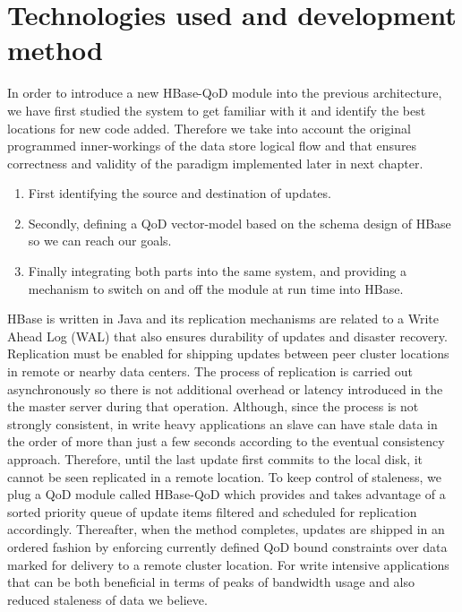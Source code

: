 \section{Technologies used and development method}\label{method}
In order to introduce a new HBase-QoD module into the previous architecture, we have first studied the system to get familiar with it and identify the best locations for new code added. Therefore we take into account the original programmed inner-workings of the data store logical flow and that ensures correctness and validity of the paradigm implemented later in next chapter. 

\begin{enumerate}
\item First identifying the source and destination of updates.
\item Secondly, defining a QoD vector-model based on the schema design of HBase so we can reach our goals.
\item Finally integrating both parts into the same system, and providing a mechanism to switch on and off the module at run time into HBase.
\end{enumerate}

HBase is written in Java and its replication mechanisms are related to a Write Ahead Log (WAL) that also ensures durability of updates and disaster recovery. Replication must be enabled for shipping updates between peer cluster locations in remote or nearby data centers. The process of replication is carried out asynchronously so there is not additional overhead or latency introduced in the the master server during that operation.  Although, since the process is not strongly consistent, in write heavy applications an slave can have stale data in the order of more than just a few seconds according to the eventual consistency approach. Therefore, until the last update first commits to the local disk, it cannot be seen replicated in a remote location. To keep control of staleness, we plug a QoD module called HBase-QoD which provides and takes advantage of a sorted priority queue of update items filtered and scheduled for replication accordingly. Thereafter, when the method completes, updates are shipped in an ordered fashion by enforcing currently defined QoD bound constraints over data marked for delivery to a remote cluster location. For write intensive applications that can be both beneficial in terms of peaks of bandwidth usage and also reduced staleness of data we believe.


